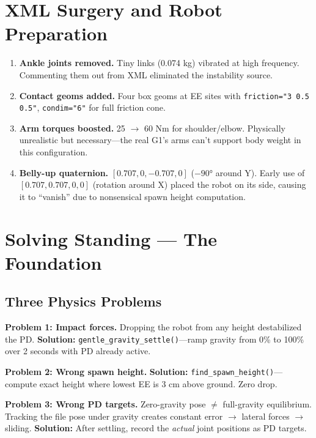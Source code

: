 \documentclass[11pt, a4paper]{article}
\begin{document}
\section{XML Surgery and Robot Preparation}

\begin{enumerate}[nosep]
\item \textbf{Ankle joints removed.} Tiny links (0.074 kg) vibrated at high frequency. Commenting them out from XML eliminated the instability source.
\item \textbf{Contact geoms added.} Four box geoms at EE sites with \texttt{friction="3 0.5 0.5"}, \texttt{condim="6"} for full friction cone.
\item \textbf{Arm torques boosted.} 25 $\rightarrow$ 60 Nm for shoulder/elbow. Physically unrealistic but necessary---the real G1's arms can't support body weight in this configuration.
\item \textbf{Belly-up quaternion.} $[0.707, 0, -0.707, 0]$ ($-90°$ around Y). Early use of $[0.707, 0.707, 0, 0]$ (rotation around X) placed the robot on its side, causing it to ``vanish'' due to nonsensical spawn height computation.
\end{enumerate}

\section{Solving Standing --- The Foundation}

\subsection{Three Physics Problems}

\textbf{Problem 1: Impact forces.} Dropping the robot from any height destabilized the PD. \textbf{Solution:} \texttt{gentle\_gravity\_settle()}---ramp gravity from 0\% to 100\% over 2 seconds with PD already active.

\textbf{Problem 2: Wrong spawn height.} \textbf{Solution:} \texttt{find\_spawn\_height()}---compute exact height where lowest EE is 3 cm above ground. Zero drop.

\textbf{Problem 3: Wrong PD targets.} Zero-gravity pose $\neq$ full-gravity equilibrium. Tracking the file pose under gravity creates constant error $\rightarrow$ lateral forces $\rightarrow$ sliding. \textbf{Solution:} After settling, record the \textit{actual} joint positions as PD targets.
\end{document}
